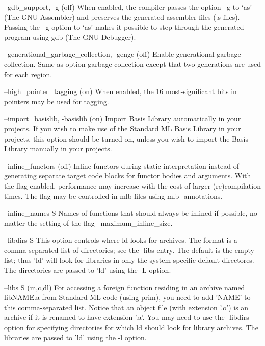 \documentclass[12pt]{book}
\begin{document}
\begin{scriptcode}
--gdb_support, -g                                        (off)
     When enabled, the compiler passes the option --g
     to `as' (The GNU Assembler) and preserves the generated
     assembler files (.s files). Passing the --g
     option to `as' makes it possible to step through
     the generated program using gdb (The GNU Debugger).

--generational_garbage_collection, -gengc                (off)
     Enable generational garbage collection. Same as option
     garbage collection except that two generations are used
     for each region.

--high_pointer_tagging                                    (on)
     When enabled, the 16 most-significant bits in pointers
     may be used for tagging.

--import_basislib, -basislib                              (on)
     Import Basis Library automatically in your projects. If
     you wish to make use of the Standard ML Basis Library
     in your projects, this option should be turned on, unless
     you wish to import the Basis Library manually in your
     projects.

--inline_functors                                        (off)
     Inline functors during static interpretation instead of
     generating separate target code blocks for functor bodies
     and arguments. With the flag enabled, performance may
     increase with the cost of larger (re)compilation times.
     The flag may be controlled in mlb-files using mlb-
     annotations.

--inline_names S
     Names of functions that should always be inlined
     if possible, no matter the setting of the flag
     --maximum_inline_size.

--libdirs S
     This option controls where ld looks for
     archives. The format is a comma-separated list
     of directories; see the -libs entry. The default
     is the empty list; thus 'ld' will look for
     libraries in only the system specific default
     directores. The directories are passed to 'ld'
     using the -L option.

--libs S                                              (m,c,dl)
     For accessing a foreign function residing in
     an archive named libNAME.a from Standard ML code
     (using prim), you need to add 'NAME' to this
     comma-separated list. Notice that an object file
     (with extension '.o') is an archive if it is
     renamed to have extension '.a'. You may need to
     use the -libdirs option for specifying
     directories for which ld should look for library
     archives. The libraries are passed to 'ld' using
     the -l option.


\end{scriptcode}
\end{document}
